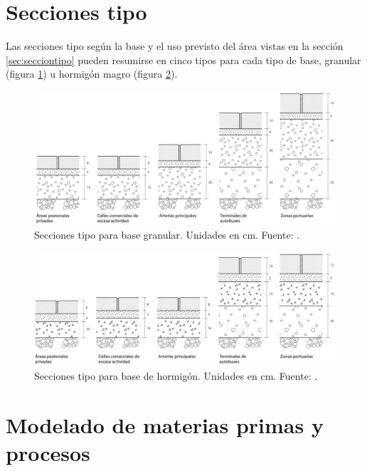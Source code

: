 \section{Secciones tipo}

Las secciones tipo según la base y el uso previsto del área vistas en la sección \ref{sec:secciontipo} pueden resumirse en cinco tipos para cada tipo de base, granular (figura \ref{fig:seccionestipogranular}) u hormigón magro (figura \ref{fig:seccionestipohormigon}).

\begin{figure}[!htb]
\centering
\includegraphics[width=15cm]{seccionestipo_1.png}
\caption[Secciones tipo para base granular.]{Secciones tipo para base granular. Unidades en cm. Fuente: \cite{fenollar}.}
\label{fig:seccionestipogranular}
\end{figure}

\begin{figure}[!htb]
\centering
\includegraphics[width=15cm]{seccionestipo_2.png}
\caption[Secciones tipo para base de hormigón.]{Secciones tipo para base de hormigón. Unidades en cm. Fuente: \cite{fenollar}.}
\label{fig:seccionestipohormigon}
\end{figure}

\section{Modelado de materias primas y procesos}\label{sec:modeladoprocesosinstalacion}


